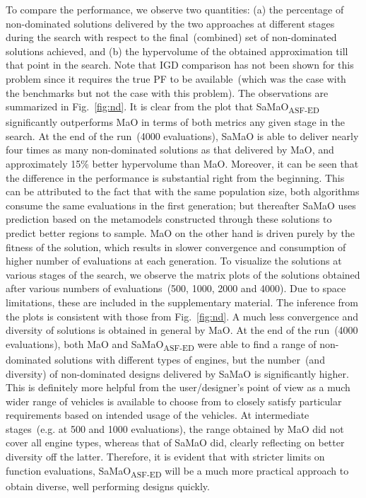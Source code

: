{\color{blue}To compare the performance, we observe two quantities: (a) the percentage of non-dominated solutions delivered by the two approaches at different stages during the search with respect to the final~(combined) set of non-dominated solutions achieved, and (b) the hypervolume of the obtained approximation till that point in the search. Note that IGD comparison has not been shown for this problem since it requires the true PF to be available~(which was the case with the benchmarks but not the case with this problem). The observations are summarized in Fig.~\ref{fig:nd}. It is clear from the plot that SaMaO\textsubscript{ASF-ED} significantly outperforms MaO in terms of both metrics any given stage in the search. At the end of the run~(4000 evaluations), SaMaO is able to deliver nearly four times as many non-dominated solutions as that delivered by MaO, and approximately 15\% better hypervolume than MaO. Moreover, it can be seen that the difference in the performance is substantial right from the beginning. This can be attributed to the fact that with the same population size, both algorithms consume the same evaluations in the first generation; but thereafter SaMaO uses prediction based on the metamodels constructed through these solutions to predict better regions to sample. MaO on the other hand is driven purely by the fitness of the solution, which results in slower convergence and consumption of higher number of evaluations at each generation.  To visualize the solutions at various stages of the search, we observe the matrix plots of the solutions obtained after various numbers of evaluations~(500, 1000, 2000 and 4000). Due to space limitations, these are included in the supplementary material. The inference from the plots is consistent with those from Fig.~\ref{fig:nd}. A much less convergence and diversity of solutions is obtained in general by MaO. At the end of the run~(4000 evaluations), both MaO and SaMaO\textsubscript{ASF-ED} were able to find a range of non-dominated solutions with different types of engines, but the number~(and diversity) of non-dominated designs delivered by SaMaO is significantly higher. This is definitely more helpful from the user/designer's point of view as a much wider range of vehicles is available to choose from to closely satisfy particular requirements based on intended usage of the vehicles. At intermediate stages~(e.g. at 500 and 1000 evaluations), the range obtained by MaO did not cover all engine types, whereas that of SaMaO did, clearly reflecting on better diversity off the latter. Therefore, it is evident that with stricter limits on function evaluations, SaMaO\textsubscript{ASF-ED} will be a much more practical approach to obtain diverse, well performing designs quickly. }

